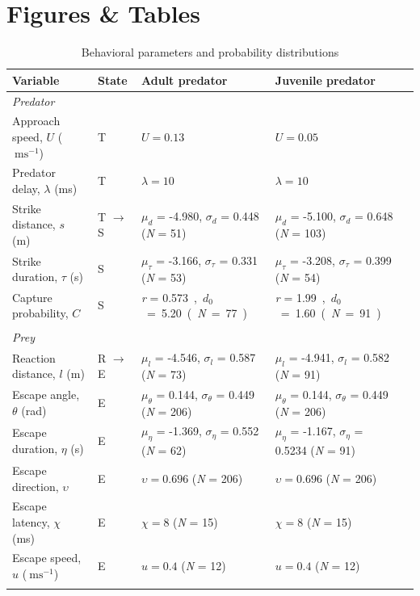 \documentclass[]{rsos}%
\begin{document}
\linespread{1}\selectfont %



\pagebreak



\section*{Figures \& Tables}

\linespread{1.3}\selectfont %

\begin{table}[!h]
\scriptsize
\caption{Behavioral parameters and probability distributions}%
\begin{tabular}{lllll}%
\hline
Variable &State &Adult predator & Juvenile predator\\
\hline
\textit{Predator}& & & & \\
Approach speed, $U$ ($\SI{}{\m\s} ^{-1}$) &T &$U = 0.13$ & $U = 0.05$ \\
Predator delay, $\lambda$ (ms) &T &$\lambda = 10$ &$\lambda = 10$ \\
Strike distance, $s$ (m) &T $\to$ S &$\mu_d$ = -4.980, $\sigma_d$ = 0.448 (\textit{N} = 51) & $\mu_d$ = -5.100, $\sigma_d$ = 0.648 (\textit{N} = 103)\\
Strike duration, $\tau$ (s) &S &$\mu_{\tau}$ = -3.166, $\sigma_{\tau}$ = 0.331 (\textit{N} = 53) & $\mu_{\tau}$ = -3.208, $\sigma_{\tau}$ = 0.399 (\textit{N} = 54) \\
Capture probability, $C$ &S &\textit{r} = \SI{0.573}, \textit{$d_0$} = \SI{5.20}  (\textit{N} = 77) &\textit{r} = \SI{1.99}, \textit{$d_0$} = \SI{1.60}  (\textit{N} = 91) \\ \\
\textit{Prey}& & & & \\
Reaction distance, $l$ (m) &R $\to$ E &$\mu_l$ = -4.546, $\sigma_l$ = 0.587 (\textit{N} = 73) &$\mu_l$ = -4.941, $\sigma_l$ = 0.582 (\textit{N} = 91) \\
Escape angle, $\theta$ (rad) &E  &$\mu_{\theta}$ = 0.144, $\sigma_{\theta}$ = 0.449 (\textit{N} = 206) &$\mu_{\theta}$ = 0.144, $\sigma_{\theta}$ = 0.449 (\textit{N} = 206) \\
Escape duration, $\eta$ (s) &E &$\mu_{\eta}$ = -1.369, $\sigma_{\eta}$ = 0.552 (\textit{N} = 62) &$\mu_{\eta}$ = -1.167, $\sigma_{\eta}$ = 0.5234 (\textit{N} = 91) \\
Escape direction, $\upsilon$ &E &$\upsilon=0.696$ (\textit{N} = 206) &$\upsilon=0.696$ (\textit{N} = 206) \\
Escape latency, $\chi$ (ms) &E &$\chi = 8$ (\textit{N} = 15) & $\chi = 8$ (\textit{N} = 15)\\
Escape speed, $u$ ($\SI{}{\m\s} ^{-1}$) &E  &$u = 0.4$ (\textit{N} = 12) &$u = 0.4$ (\textit{N} = 12) \\\hline
\label{table}
\end{tabular}


\end{table}
\end{document}
